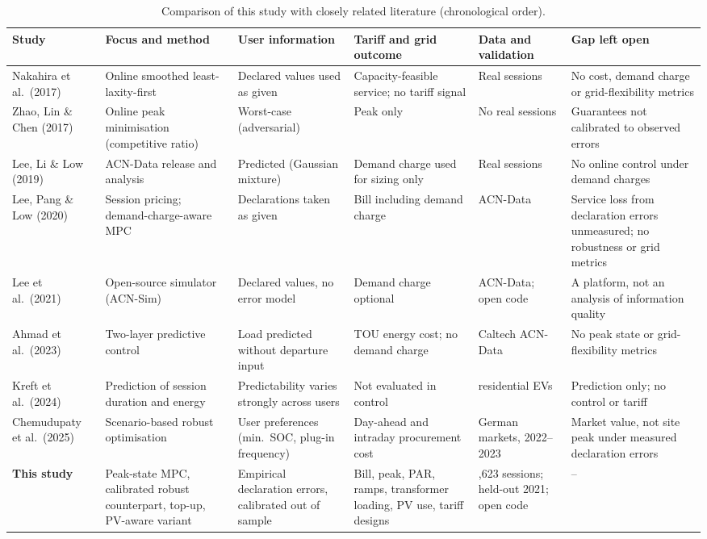 \begin{table}[!htbp]
\centering
\caption{Comparison of this study with closely related literature (chronological order).}
\label{tab:lit}
\scriptsize
\setlength{\tabcolsep}{2.5pt}
\renewcommand{\arraystretch}{1.12}
\begin{tabular*}{\textwidth}{@{\extracolsep{\fill}}*{6}{>{\raggedright\arraybackslash}p{}}@{}}
\hline
Study & Focus and method & User information & Tariff and grid outcome & Data and validation & Gap left open \\
\hline
Nakahira et al.\ (2017) \cite{Nakahira2017sLLF} & Online smoothed least-laxity-first & Declared values used as given & Capacity-feasible service; no tariff signal & Real sessions & No cost, demand charge or grid-flexibility metrics \\
Zhao, Lin \& Chen (2017) \cite{Zhao2017RobustOnline} & Online peak minimisation (competitive ratio) & Worst-case (adversarial) & Peak only & No real sessions & Guarantees not calibrated to observed errors \\
Lee, Li \& Low (2019) \cite{Lee2019ACNData} & ACN-Data release and analysis & Predicted (Gaussian mixture) & Demand charge used for sizing only & Real sessions & No online control under demand charges \\
Lee, Pang \& Low (2020) \cite{Lee2020Pricing} & Session pricing; demand-charge-aware MPC & Declarations taken as given & Bill including demand charge & ACN-Data & Service loss from declaration errors unmeasured; no robustness or grid metrics \\
Lee et al.\ (2021) \cite{Lee2021ACNSim} & Open-source simulator (ACN-Sim) & Declared values, no error model & Demand charge optional & ACN-Data; open code & A platform, not an analysis of information quality \\
Ahmad et al.\ (2023) \cite{Ahmad2023TwoLayer} & Two-layer predictive control & Load predicted without departure input & TOU energy cost; no demand charge & Caltech ACN-Data & No peak state or grid-flexibility metrics \\
Kreft et al.\ (2024) \cite{Kreft2024Predictability} & Prediction of session duration and energy & Predictability varies strongly across users & Not evaluated in control & 267 residential EVs & Prediction only; no control or tariff \\
Chemudupaty et al.\ (2025) \cite{Chemudupaty2025SpotMarkets} & Scenario-based robust optimisation & User preferences (min.\ SOC, plug-in frequency) & Day-ahead and intraday procurement cost & German markets, 2022--2023 & Market value, not site peak under measured declaration errors \\
\textbf{This study} & Peak-state MPC, calibrated robust counterpart, top-up, PV-aware variant & Empirical declaration errors, calibrated out of sample & Bill, peak, PAR, ramps, transformer loading, PV use, tariff designs & 13,623 sessions; held-out 2021; open code & -- \\
\hline
\end{tabular*}
\end{table}

